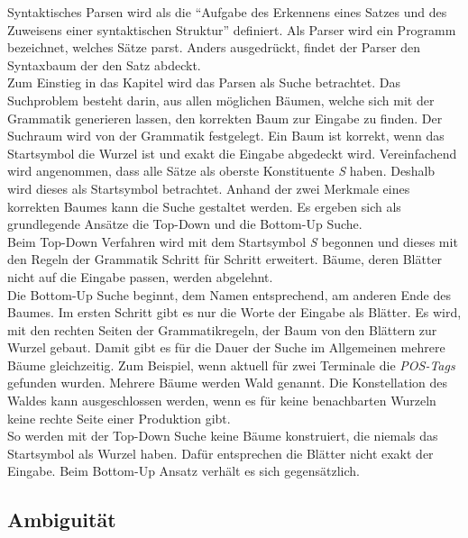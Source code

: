 Syntaktisches Parsen wird als die ``Aufgabe des Erkennens eines Satzes und des Zuweisens einer syntaktischen Struktur''\cite[S. 461]{nlpGrundlagen} definiert.
Als Parser wird ein Programm bezeichnet, welches Sätze parst. Anders ausgedrückt, findet der Parser den Syntaxbaum der den Satz abdeckt. \\
Zum Einstieg in das Kapitel wird das Parsen als Suche betrachtet. Das Suchproblem besteht darin, aus allen möglichen Bäumen, welche sich mit der Grammatik generieren lassen, den korrekten Baum zur Eingabe zu finden. Der Suchraum wird von der Grammatik festgelegt. Ein Baum ist korrekt, wenn das Startsymbol die Wurzel ist und exakt die Eingabe abgedeckt wird. Vereinfachend wird angenommen, dass alle Sätze als oberste Konstituente \textit{S} haben. Deshalb wird dieses als Startsymbol betrachtet. Anhand der zwei Merkmale eines korrekten Baumes kann die Suche gestaltet werden. Es ergeben sich als grundlegende Ansätze die Top-Down und die Bottom-Up Suche. \\
Beim Top-Down Verfahren wird mit dem Startsymbol \textit{S} begonnen und dieses mit den Regeln der Grammatik Schritt für Schritt erweitert. Bäume, deren Blätter nicht auf die Eingabe passen, werden abgelehnt. \\
Die Bottom-Up Suche beginnt, dem Namen entsprechend, am anderen Ende des Baumes. Im ersten Schritt gibt es nur die Worte der Eingabe als Blätter. Es wird, mit den rechten Seiten der Grammatikregeln, der Baum von den Blättern zur Wurzel gebaut. Damit gibt es für die Dauer der Suche im Allgemeinen mehrere Bäume gleichzeitig. Zum Beispiel, wenn aktuell für zwei Terminale die \textit{POS-Tags} gefunden wurden. Mehrere Bäume werden Wald genannt. %
Die Konstellation des Waldes kann ausgeschlossen werden, wenn es für keine benachbarten Wurzeln keine rechte Seite einer Produktion gibt. \\
So werden mit der Top-Down Suche keine Bäume konstruiert, die niemals das Startsymbol als Wurzel haben. Dafür entsprechen die Blätter nicht exakt der Eingabe. Beim Bottom-Up Ansatz verhält es sich gegensätzlich. %
\subsection{Ambiguität}

